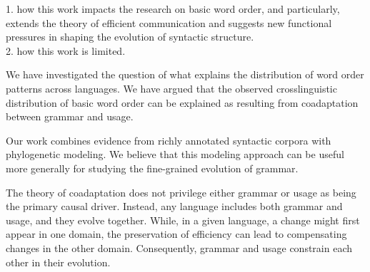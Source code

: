 \documentclass[11pt,a4paper]{article}
\begin{document}












{\color{blue} 1. how this work impacts the research on basic word order, and particularly, extends the theory of efficient communication and suggests new functional pressures in shaping the evolution of syntactic structure.}\\

{\color{blue} 2. how this work is limited.}


We have investigated the question of what explains the distribution of word order patterns across languages.
We have argued that the observed crosslinguistic distribution of basic word order can be explained as resulting from coadaptation between grammar and usage.

Our work combines evidence from richly annotated syntactic corpora with phylogenetic modeling. We believe that this modeling approach can be useful more generally for studying the fine-grained evolution of grammar.

The theory of coadaptation does not privilege either grammar or usage as being the primary causal driver.
Instead, any language includes both grammar and usage, and they evolve together.
While, in a given language, a change might first appear in one domain, the preservation of efficiency can lead to compensating changes in the other domain.
Consequently, grammar and usage constrain each other in their evolution.
\end{document}
